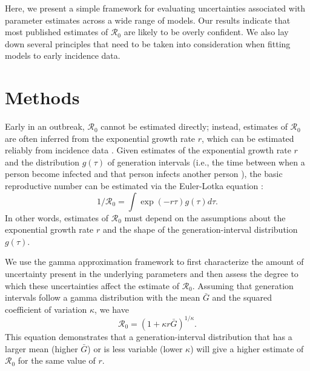 \documentclass[12pt]{article}
\begin{document}
Here, we present a simple framework for evaluating uncertainties 
associated with parameter estimates
across a wide range of models.
Our results indicate that most published estimates of $\mathcal R_0$
are likely to be overly confident. 
We also lay down several principles that need to be taken into
consideration when fitting models to early incidence data.

\section{Methods}

Early in an outbreak, $\mathcal R_0$ cannot be estimated directly;
instead, estimates of $\mathcal R_0$ are often inferred from
the exponential growth rate $r$, which can be estimated reliably from incidence data \citep{chowell2003sars, mills2004transmissibility, nishiura2009transmission, nishiura2010pros, ma2014estimating}.
Given estimates of the exponential growth rate $r$ and the distribution $g(\tau)$ of
generation intervals (i.e., the time between when a person become 
infected and that person infects another person \citep{svensson2007note}), the basic reproductive
number can be estimated via the Euler-Lotka equation \citep{wallinga2007generation}:
\begin{equation}
1/\mathcal R_0 = \int \exp(-r\tau) g(\tau) d\tau.
\end{equation}
In other words, estimates of $\mathcal R_0$
must depend on the assumptions about the
exponential growth rate $r$ and the shape of the generation-interval distribution $g(\tau)$.

We use the gamma approximation framework \citep{park2019practical} to first characterize the
amount of uncertainty present in the underlying parameters and then assess the 
degree to which these uncertainties
affect the estimate of $\mathcal R_0$.
Assuming that generation intervals follow a gamma distribution 
with the mean $\bar G$ and the squared coefficient of variation $\kappa$, 
we have
\begin{equation}
\mathcal R_0 = \left(1 + \kappa r \bar{G}\right)^{1/\kappa}.
\label{eq:gamma}
\end{equation}
This equation demonstrates that a generation-interval distribution
that has a larger mean (higher $\bar{G}$) or is less variable (lower $\kappa$)
will give a higher estimate of $\mathcal R_0$ for the same value of $r$.
\end{document}
